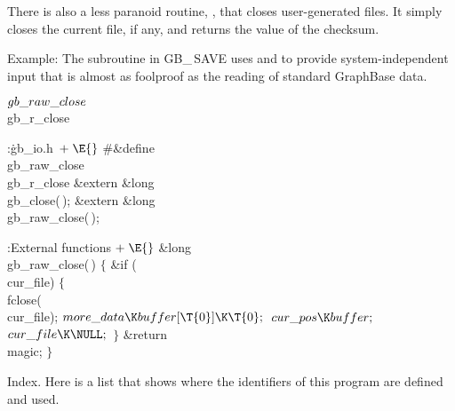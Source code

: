 There is also a less paranoid routine, , that
closes user-generated files. It simply closes the current file, if any,
and returns the value of the  checksum.

Example: The  subroutine in {\sc GB\_\,SAVE} uses
 and  to provide
system-independent input
that is almost as foolproof as the reading of standard GraphBase data.

\fi

\B\D$\\{gb\_raw\_close}$ \5
\\{gb\_r\_close}\par
\Y\B\4:\.{gb\_io.h\,}\X${}\mathrel+\E{}$\6
\8\#\&{define} \\{gb\_raw\_close}\5\\{gb\_r\_close}\6
\&{extern} \&{long} \\{gb\_close}(\,);\6
\&{extern} \&{long} \\{gb\_raw\_close}(\,);\par
\fi

\B{}:External functions\X${}\mathrel+\E{}$\6
\1\1\&{long} \\{gb\_raw\_close}(\,)\2\2\6
${}\{{}$\1\6
\&{if} (\\{cur\_file})\5
${}\{{}$\1\6
\\{fclose}(\\{cur\_file});\6
${}\\{more\_data}\K\\{buffer}[\T{0}]\K\T{0};{}$\6
${}\\{cur\_pos}\K\\{buffer};{}$\6
${}\\{cur\_file}\K\NULL;{}$\6
\4${}\}{}$\2\6
\&{return} \\{magic};\6
\4${}\}{}$\2\par
\fi

Index. Here is a list that shows where the identifiers of this program
are
defined and used.
\fi

\inx
\fin
\con
